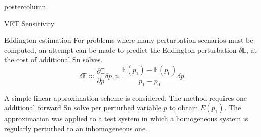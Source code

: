 \documentclass[xcolor={usenames,dvipsnames,svgnames,table}]{beamer}
\newcommand{\Edd}{\mathbb{E}}
\begin{document}
\begin{frame}
\begin{columns}
\begin{column}{.33\textwidth}
\begin{beamercolorbox}[center,wd=\textwidth]{postercolumn}
\begin{minipage}[T]{0.95\textwidth}
{\begin{block}{VET Sensitivity}
			    \end{block}
			    \vfill
			    \begin{block}{Eddington estimation}
			    For problems where many perturbation scenarios must be computed, an attempt can be made to predict the Eddington perturbation $\delta \Edd$, at the cost of additional Sn solves. 
\begin{equation}
	\delta \Edd \approx \frac{\partial \Edd}{\partial p} \delta p \approx \frac{\Edd(p_1) - \Edd(p_0)}{p_1 - p_0} \delta p	     
\end{equation}

A simple linear approximation scheme is considered. The method requires one additional forward Sn solve per perturbed variable $p$ to obtain $E(p_1)$.	
The approximation was applied to a test system in which a homogeneous system is regularly perturbed to an inhomogeneous one.


\end{block}}
\end{minipage}
\end{beamercolorbox}
\end{column}
\end{columns}
\end{frame}
\end{document}
